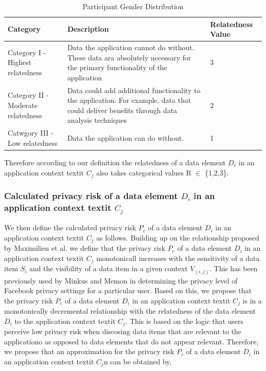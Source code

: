 \documentclass[conference]{IEEEtran}
\begin{document}
\begin{center}
\begin{table}[htbp]
\caption{Participant Gender Distribution}
\begin{center}
\begin{tabular}{|l|l|l|} 
\hline
Category & Description & Relatedness Value \\
\hline
Category I - Highest relatedness & Data the application cannot do without. These data ara absolutely necessary for the primary functionality of the application & 3 \\
\hline
Category II - Moderate relatedness & Data could add additional functionality to the application. For example, data that could deliver benefits through data analysis techniques & 2 \\
\hline
Catwgory III - Low relatedness & Data the application can do without. & 1 \\
\hline
\end{tabular}
\end{center}
\end{table}
\end{center} 
Therefore according to our definition the relatedness of a data element \textit {$D_i$} in an application context textit {$C_j$} also takes categorical values R $\in$ \{1,2,3\}.

\subsubsection {Calculated privacy risk of a data element \textit {$D_i$} in an application context textit {$C_j$} } We then define the calculated privacy risk \textit{$P_c$} of a data element \textit {$D_i$} in an application context textit {$C_j$} as follows. Building up on the relationship proposed by Maximilien et al. \cite {maximilien2009privacy} we define that the privacy risk \textit{$P_c$} of a data element \textit {$D_i$} in an application context textit {$C_j$}  monotonicall increases with the sensitivity of a data item \textit{$S_i$} and the visibility of a data item in a given context \textit{$V_(i,j)$}. This has been previously used by Minkus and Memon \cite{minkus2014scale} in determining the privacy level of Facebook privacy settings for a particular user. Based on this, we propose that the privacy risk \textit{$P_c$} of a data element \textit {$D_i$} in an application context textit {$C_j$} is in a monotonically decremental relationship with the relatedness of the data element \textit {$D_i$} to the application context textit {$C_j$}. This is based on the logic that users perceive low privacy risk when discosing data items that are relevant to the applicationo as opposed to data elements that do not appear relevant. Therefore, we propose that an approximation for the privacy risk \textit{$P_c$} of a data element \textit {$D_i$} in an application context textit {$C_j$}n can be obtained by,
\end{document}
